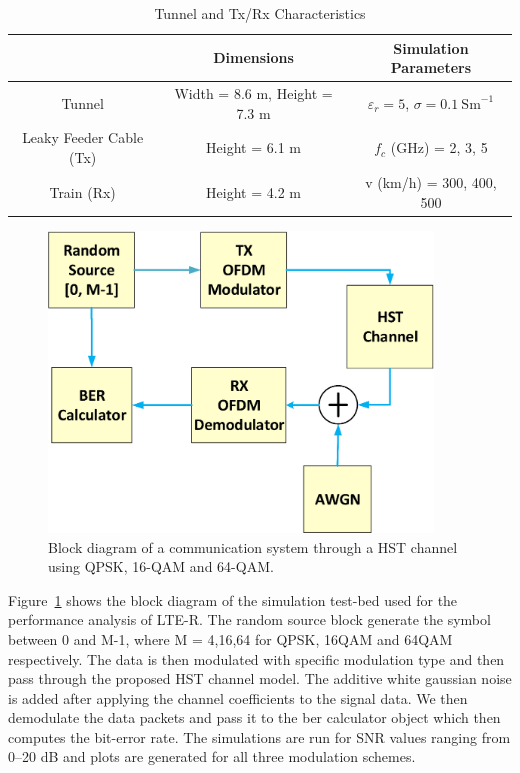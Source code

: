 \begin{table}[t!]
\centering
\caption{Tunnel and Tx/Rx Characteristics}
\begin{tabular}{c  c  c }
   & Dimensions & Simulation Parameters\\\hline
Tunnel & Width = 8.6 m, Height = 7.3 m & $\varepsilon_r = 5$, $\sigma = 0.1~\textrm{Sm}^{-1}$\\\hline
Leaky Feeder Cable (Tx) & Height = 6.1 m & $f_c$ (GHz) = 2, 3, 5\\\hline
Train (Rx) & Height = 4.2 m &  v (km/h) = 300, 400, 500\\
\hline
\end{tabular}
\label{tablelter}
\end{table}

\begin{figure}[!ht]
\centering
\includegraphics[width=\textwidth,height=8cm,keepaspectratio]{images/Gill/lte_figs/finalblock.eps} 
\caption{Block diagram of a communication system through a HST channel using QPSK, 16-QAM and 64-QAM.}
\label{finalblock}
\end{figure}

Figure~\ref{finalblock} shows the block diagram of the simulation test-bed used for the performance analysis of LTE-R. The random source block generate the symbol between 0 and M-1, where M = 4,16,64 for QPSK, 16QAM and 64QAM respectively. The data is then modulated with specific modulation type and then pass through the proposed HST channel model. The additive white gaussian noise is added after applying the channel coefficients to the signal data. We then demodulate the data packets and pass it to the ber calculator object which then computes the bit-error rate. The simulations are run for SNR values ranging from 0--20 dB and plots are generated for all three modulation schemes.

